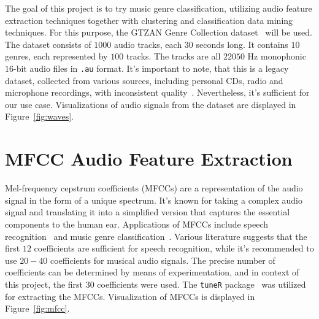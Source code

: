 \documentclass[twocolumn]{article}
\begin{document}
The goal of this project is to try music genre classification, utilizing audio feature extraction techniques together with clustering and classification data mining techniques. For this purpose, the GTZAN Genre Collection dataset~\cite{tzanetakis_essl_cook_2001} will be used. The dataset consists of $1000$ audio tracks, each $30$ seconds long. It contains $10$ genres, each represented by $100$ tracks. The tracks are all $22050$ Hz monophonic $16$-bit audio files in \texttt{.au} format. It's important to note, that this is a legacy dataset, collected from various sources, including personal CDs, radio and microphone recordings, with inconsistent quality~\cite{sturm2013gtzan}. Nevertheless, it's sufficient for our use case. Visualizations of audio signals from the dataset are displayed in Figure~\ref{fig:waves}.
\section{MFCC Audio Feature Extraction}
Mel-frequency cepstrum coefficients (MFCCs) are a representation of the audio signal in the form of a unique spectrum. It's known for taking a complex audio signal and translating it into a simplified version that captures the essential components to the human ear. Applications of MFCCs include speech recognition~\cite{ganchev2005comparative} and music genre classification~\cite{lerch2012introduction}. Various literature suggests that the first $12$ coefficients are sufficient for speech recognition, while it's recommended to use $20-40$ coefficients for musical audio signals. The precise number of coefficients can be determined by means of experimentation, and in context of this project, the first $30$ coefficients were used. The \texttt{tuneR} package~\cite{tuneR} was utilized for extracting the MFCCs. Visualization of MFCCs is displayed in Figure~\ref{fig:mfcc}.
\end{document}
